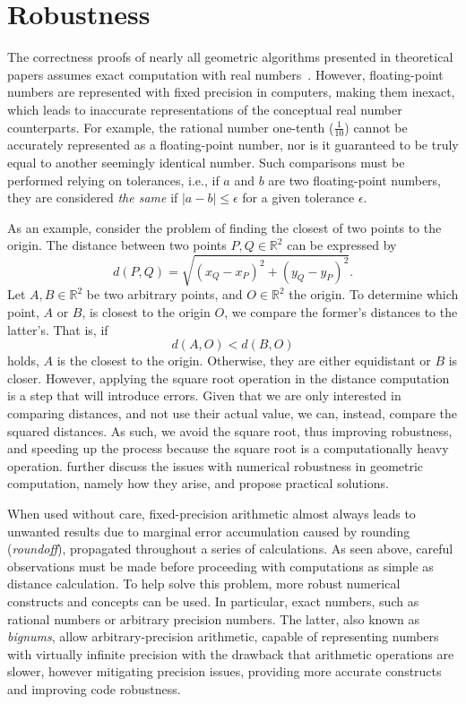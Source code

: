 \section{Robustness}%
\label{sec:related.robustness}

The correctness proofs of nearly all geometric algorithms presented in
theoretical papers assumes exact computation with real
numbers~\cite{CGAL:4.13:23LGK}.  However, floating-point numbers are represented
with fixed precision in computers, making them inexact, which leads to
inaccurate representations of the conceptual real number counterparts.  For
example, the rational number one-tenth ($\frac{1}{10}$) cannot be accurately
represented as a floating-point number, nor is it guaranteed to be truly equal
to another seemingly identical number.  Such comparisons must be performed
relying on tolerances, i.e., if $a$ and $b$ are two floating-point numbers, they
are considered \textit{the same} if $|a - b| \le \epsilon$ for a given tolerance
$\epsilon$.

As an example, consider the problem of finding the closest of two points
to the origin.  The distance between two points $P,Q \in \mathbb{R}^2$ can be
expressed by
%
\begin{equation}\label{eq:distance.2}
  d(P, Q) = \sqrt{(x_Q - x_P)^2 + (y_Q - y_P)^2}.
\end{equation}
%
Let $A,B \in \mathbb{R}^2$ be two arbitrary points, and $O \in \mathbb{R}^2$ the
origin.  To determine which point, $A$ or $B$, is closest to the origin $O$, we
compare the former's distances to the latter's.  That is, if
%
\[ 
  d(A, O) < d(B, O) 
\]
%
holds, $A$ is the closest to the origin.  Otherwise, they are either equidistant
or $B$ is closer.  However, applying the square root operation in the distance
computation is a step that will introduce errors.  Given that we are only
interested in comparing distances, and not use their actual value, we can,
instead, compare the squared distances.  As such, we avoid the square root, thus
improving robustness, and speeding up the process because the square root is a
computationally heavy operation.   further discuss the
issues with numerical robustness in geometric computation, namely how they
arise, and propose practical solutions.

When used without care, fixed-precision arithmetic almost always leads to
unwanted results due to marginal error accumulation caused by rounding
(\textit{roundoff}), propagated throughout a series of calculations.  As seen
above, careful observations must be made before proceeding with computations as
simple as distance calculation.  To help solve this problem, more robust
numerical constructs and concepts can be used.  In particular, exact numbers,
such as rational numbers or arbitrary precision numbers. The latter, also known
as \textit{bignums}, allow arbitrary-precision arithmetic, capable of
representing numbers with virtually infinite precision with the drawback that
arithmetic operations are slower, however mitigating precision issues, providing
more accurate constructs and improving code robustness.

